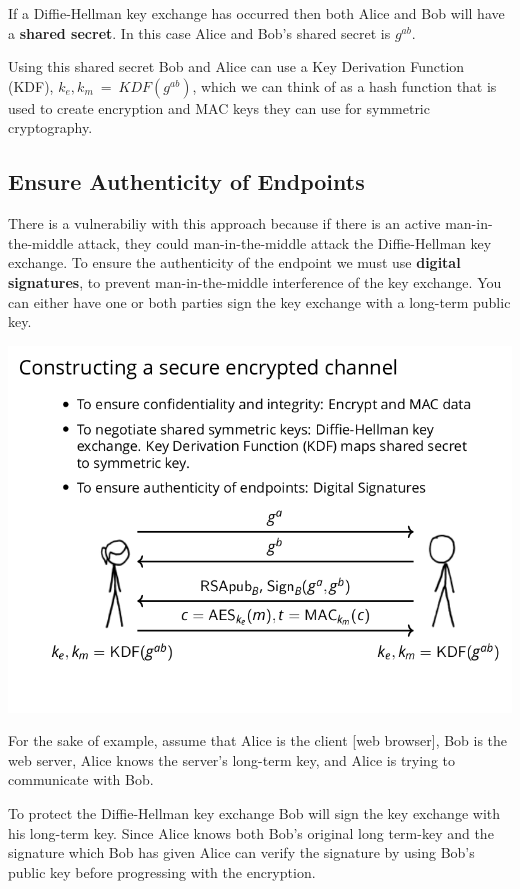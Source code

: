 \documentclass[11pt]{article} %
\begin{document}
{\parindent

\bigskip
{\parindent0pt If a Diffie-Hellman key exchange has occurred then both Alice 
and Bob will have a \textbf{shared secret}. In this case Alice and Bob's shared
secret is $g^{ab}$.}

\bigskip
{\parindent0pt Using this shared secret Bob and Alice can use a Key Derivation
Function (KDF), 
\smallskip
$k_e, k_m\ =\ KDF(g^{ab})$, which we can think of as a hash function that is 
used to create encryption and MAC keys they can use for symmetric cryptography.}

\newpage
\subsection{Ensure Authenticity of Endpoints}
There is a vulnerabiliy with this approach because if there is an active
man-in-the-middle attack, they could man-in-the-middle attack the Diffie-Hellman
key exchange.  To ensure the authenticity of the endpoint we must use
\textbf{digital signatures}, to prevent man-in-the-middle interference of the
key exchange.
\smallskip
You can either have one or both parties sign the key exchange with a long-term
public key.

\includegraphics[scale=.7]{./tls3.png}

For the sake of example, assume that Alice is the client [web browser], Bob is 
the web server, Alice knows the server's long-term key, and Alice is trying to
communicate with Bob.

\bigskip
To protect the Diffie-Hellman key exchange Bob will sign the key exchange with 
his long-term key.  Since Alice knows both Bob's original long term-key and the
signature which Bob has given Alice can verify the signature by using Bob's
public key before progressing with the encryption.

}
\end{document}
